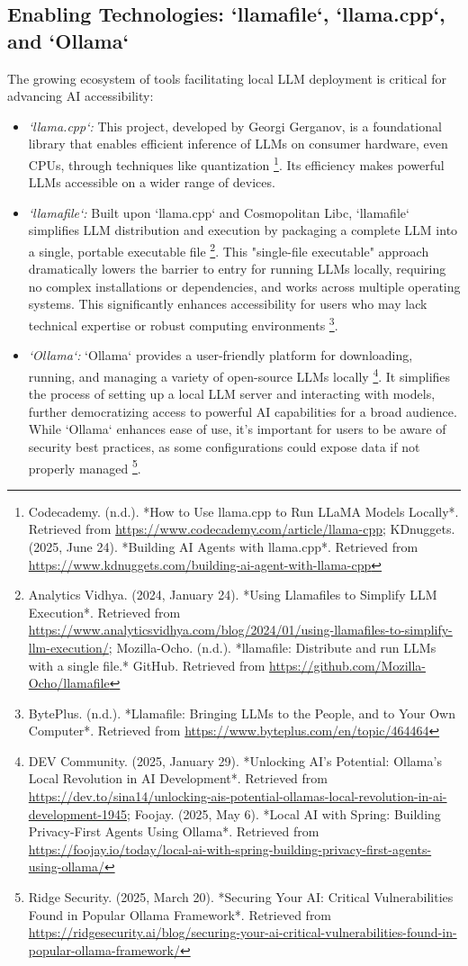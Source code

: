 \subsection{Enabling Technologies: `llamafile`, `llama.cpp`, and `Ollama`}
The growing ecosystem of tools facilitating local LLM deployment is critical for advancing AI accessibility:
\begin{itemize}
    \item \emph{`llama.cpp`:} This project, developed by Georgi Gerganov, is a foundational library that enables efficient inference of LLMs on consumer hardware, even CPUs, through techniques like quantization \footnote{Codecademy. (n.d.). *How to Use llama.cpp to Run LLaMA Models Locally*. Retrieved from \url{https://www.codecademy.com/article/llama-cpp}; KDnuggets. (2025, June 24). *Building AI Agents with llama.cpp*. Retrieved from \url{https://www.kdnuggets.com/building-ai-agent-with-llama-cpp}}. Its efficiency makes powerful LLMs accessible on a wider range of devices.
    \item \emph{`llamafile`:} Built upon `llama.cpp` and Cosmopolitan Libc, `llamafile` simplifies LLM distribution and execution by packaging a complete LLM into a single, portable executable file \footnote{Analytics Vidhya. (2024, January 24). *Using Llamafiles to Simplify LLM Execution*. Retrieved from \url{https://www.analyticsvidhya.com/blog/2024/01/using-llamafiles-to-simplify-llm-execution/}; Mozilla-Ocho. (n.d.). *llamafile: Distribute and run LLMs with a single file.* GitHub. Retrieved from \url{https://github.com/Mozilla-Ocho/llamafile}}. This "single-file executable" approach dramatically lowers the barrier to entry for running LLMs locally, requiring no complex installations or dependencies, and works across multiple operating systems. This significantly enhances accessibility for users who may lack technical expertise or robust computing environments \footnote{BytePlus. (n.d.). *Llamafile: Bringing LLMs to the People, and to Your Own Computer*. Retrieved from \url{https://www.byteplus.com/en/topic/464464}}.
    \item \emph{`Ollama`:} `Ollama` provides a user-friendly platform for downloading, running, and managing a variety of open-source LLMs locally \footnote{DEV Community. (2025, January 29). *Unlocking AI's Potential: Ollama's Local Revolution in AI Development*. Retrieved from \url{https://dev.to/sina14/unlocking-ais-potential-ollamas-local-revolution-in-ai-development-1945}; Foojay. (2025, May 6). *Local AI with Spring: Building Privacy-First Agents Using Ollama*. Retrieved from \url{https://foojay.io/today/local-ai-with-spring-building-privacy-first-agents-using-ollama/}}. It simplifies the process of setting up a local LLM server and interacting with models, further democratizing access to powerful AI capabilities for a broad audience. While `Ollama` enhances ease of use, it's important for users to be aware of security best practices, as some configurations could expose data if not properly managed \footnote{Ridge Security. (2025, March 20). *Securing Your AI: Critical Vulnerabilities Found in Popular Ollama Framework*. Retrieved from \url{https://ridgesecurity.ai/blog/securing-your-ai-critical-vulnerabilities-found-in-popular-ollama-framework/}}.
\end{itemize}
